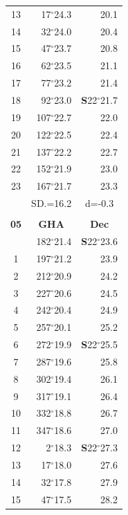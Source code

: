 \documentclass[10pt, a4paper]{report}
\begin{document}
\begin{scriptsize}
\begin{tabular*}{0.2\textwidth}[t]{@{\extracolsep{\fill}}|c|rr|}
13 & 17$^\circ$24.3 & 20.1\\
14 & 32$^\circ$24.0 & 20.4\\
15 & 47$^\circ$23.7 & \raisebox{0.24ex}{\boldmath$\cdot$~\boldmath$\cdot$~~}20.8\\
16 & 62$^\circ$23.5 & 21.1\\
17 & 77$^\circ$23.2 & 21.4\\[2Pt]
18 & 92$^\circ$23.0 & \textbf{S}22$^\circ$21.7\\
19 & 107$^\circ$22.7 & 22.0\\
20 & 122$^\circ$22.5 & 22.4\\
21 & 137$^\circ$22.2 & \raisebox{0.24ex}{\boldmath$\cdot$~\boldmath$\cdot$~~}22.7\\
22 & 152$^\circ$21.9 & 23.0\\
23 & 167$^\circ$21.7 & 23.3\\
\hline
\rule{0pt}{2.4ex} & \multicolumn{1}{c}{SD.=16.2} & \multicolumn{1}{c|}{d=-0.3}\\
\hline
\multicolumn{1}{c}{}\\[-0.5ex]\hline
\multicolumn{1}{|c|}{\rule{0pt}{2.6ex}\textbf{05}} & \multicolumn{1}{c}{\textbf{GHA}} & \multicolumn{1}{c|}{\textbf{Dec}}\\
\hline\rule{0pt}{2.6ex}\noindent
0 & 182$^\circ$21.4 & \textbf{S}22$^\circ$23.6\\
1 & 197$^\circ$21.2 & 23.9\\
2 & 212$^\circ$20.9 & 24.2\\
3 & 227$^\circ$20.6 & \raisebox{0.24ex}{\boldmath$\cdot$~\boldmath$\cdot$~~}24.5\\
4 & 242$^\circ$20.4 & 24.9\\
5 & 257$^\circ$20.1 & 25.2\\[2Pt]
6 & 272$^\circ$19.9 & \textbf{S}22$^\circ$25.5\\
7 & 287$^\circ$19.6 & 25.8\\
8 & 302$^\circ$19.4 & 26.1\\
9 & 317$^\circ$19.1 & \raisebox{0.24ex}{\boldmath$\cdot$~\boldmath$\cdot$~~}26.4\\
10 & 332$^\circ$18.8 & 26.7\\
11 & 347$^\circ$18.6 & 27.0\\[2Pt]
12 & 2$^\circ$18.3 & \textbf{S}22$^\circ$27.3\\
13 & 17$^\circ$18.0 & 27.6\\
14 & 32$^\circ$17.8 & 27.9\\
15 & 47$^\circ$17.5 & \raisebox{0.24ex}{\boldmath$\cdot$~\boldmath$\cdot$~~}28.2\\

\end{tabular*}
\end{scriptsize}
\end{document}
